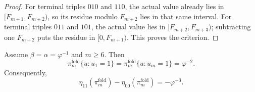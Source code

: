 \begin{proof}
For terminal triples \(010\) and \(110\), the actual value already lies in
\([F_{m+1},F_{m+2})\), so its residue modulo \(F_{m+2}\) lies in that same
interval.  For terminal triples \(011\) and \(101\), the actual value lies in
\([F_{m+2},F_{m+3})\); subtracting one \(F_{m+2}\) puts the residue in
\([0,F_{m+1})\).  This proves the criterion.
\end{proof}

\begin{lemma}
\label{lem:golden-fold-endpoint-masses}
Assume \(\beta=\alpha=\varphi^{-1}\) and \(m\ge6\). Then
\[
\pi_m^{\mathrm{fold}}\{u:u_1=1\}
=
\pi_m^{\mathrm{fold}}\{u:u_m=1\}
=
\varphi^{-2}.
\]
Consequently,
\[
\eta_{11}(\pi_m^{\mathrm{fold}})
-
\eta_{00}(\pi_m^{\mathrm{fold}})
=
-\varphi^{-3}.
\]
\end{lemma}

